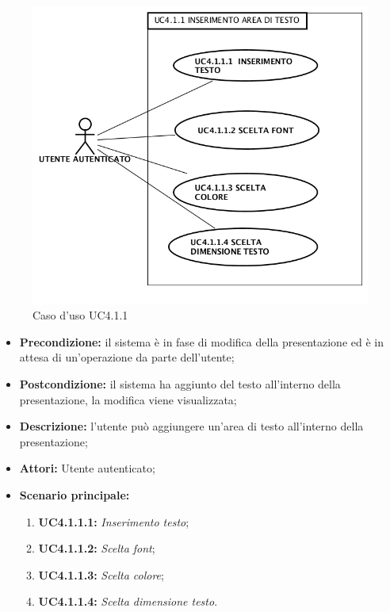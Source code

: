 \begin{figure}[h]
	\begin{center}
	\includegraphics[scale=0.4]{diagram/UC4-1-1.png}
	\caption{Caso d'uso UC4.1.1}
	\end{center}
\end{figure}
\begin{itemize}
	\item \textbf{Precondizione:} il sistema è in fase di modifica della presentazione ed è in attesa di un'operazione da parte dell'utente;
	\item \textbf{Postcondizione:} il sistema ha aggiunto del testo all'interno della presentazione, la modifica viene visualizzata;
	\item \textbf{Descrizione:} l'utente può aggiungere un'area di testo all'interno della presentazione;
	\item \textbf{Attori:} Utente autenticato;
	\item \textbf{Scenario principale:}
	\begin{enumerate}
		\item \textbf{ UC4.1.1.1:} \textit{ Inserimento testo};
		\item \textbf{ UC4.1.1.2:} \textit{ Scelta font};
		\item \textbf{ UC4.1.1.3:} \textit{ Scelta colore};
		\item \textbf{ UC4.1.1.4:} \textit{ Scelta dimensione testo}.
	\end{enumerate}
\end{itemize}
